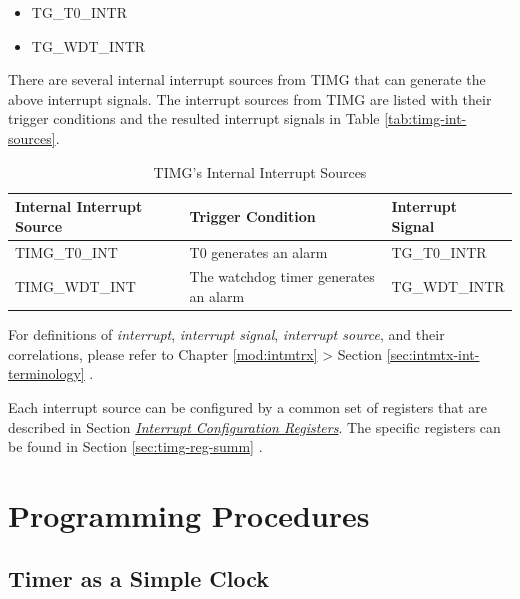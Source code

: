 \documentclass[main\_\_EN.tex]{subfiles}
\begin{document}
    \begin{itemize}
        \item TG\_T0\_INTR
        \item TG\_WDT\_INTR
    \end{itemize}

There are several internal interrupt sources from TIMG that can generate the above interrupt signals. The interrupt sources from TIMG are listed with their trigger conditions and the resulted interrupt signals in Table \ref{tab:timg-int-sources}.

\begin{longtable}{ | L{5cm} | L{6.5cm} | L{4cm} | }
\caption{TIMG's Internal Interrupt Sources}
\label{tab:timg-int-sources}
\\ \hline
{}
\textbf{Internal Interrupt Source} & \textbf{Trigger Condition}  &  \textbf{Interrupt Signal}\\ \hline
\label{int:TIMGT0INT}TIMG\_T0\_INT  &  T0 generates an alarm &  TG\_T0\_INTR  \\ \hline
\label{int:TIMGWDTINT}TIMG\_WDT\_INT &  The watchdog timer generates an alarm & TG\_WDT\_INTR \\ \hline
\end{longtable}

\begin{tiplisting}
For definitions of \textit{interrupt}, \textit{interrupt signal}, \textit{interrupt source}, and their correlations, please refer to Chapter \ref{mod:intmtrx} \textit{} > Section \ref{sec:intmtx-int-terminology} \textit{}.
\end{tiplisting}

Each interrupt source can be configured by a common set of registers that are described in Section \hyperref[interrupt-config-registers]{\textit{Interrupt Configuration Registers}}. The specific registers can be found in Section \ref{sec:timg-reg-summ} \textit{}.


\section{Programming Procedures}

\subsection{Timer as a Simple Clock}
\label{sec:timg-func-descr-simple-clock}
\end{document}
